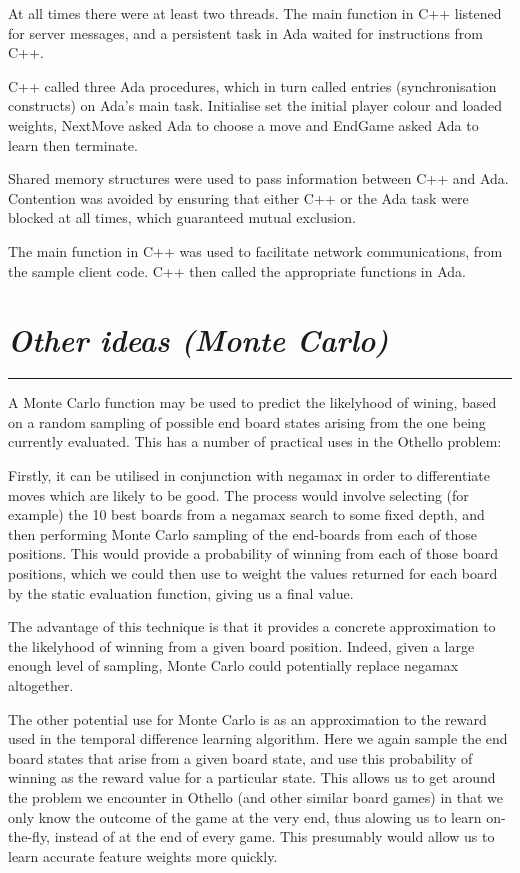 \documentclass[10pt]{report}
\begin{document}
\begin{multicols}{2}
At all times there were at least two threads. The main function in C++ listened for server messages, and a persistent task in Ada waited for instructions from C++.

C++ called three Ada procedures, which in turn called entries (synchronisation constructs) on Ada's main task. Initialise set the initial player colour and loaded weights, NextMove asked Ada to choose a move and EndGame asked Ada to learn then terminate.

Shared memory structures were used to pass information between C++ and Ada. Contention was avoided by ensuring that either C++ or the Ada task were blocked at all times, which guaranteed mutual exclusion.

The main function in C++ was used to facilitate network communications, from the sample client code. C++ then called the appropriate functions in Ada.

\section*{\emph{Other ideas (Monte Carlo)}}
\hrule
A Monte Carlo function may be used to predict the likelyhood of wining, based on a random sampling of possible end board states arising from the one being currently evaluated. This has a number of practical uses in the Othello problem:

Firstly, it can be utilised in conjunction with negamax in order to differentiate moves which are likely to be good. The process would involve selecting (for example) the 10 best boards from a negamax search to some fixed depth, and then performing Monte Carlo sampling of the end-boards from each of those positions. This would provide a probability of winning from each of those board positions, which we could then use to weight the values returned for each board by the static evaluation function, giving us a final value.

The advantage of this technique is that it provides a concrete approximation to the likelyhood of winning from a given board position. Indeed, given a large enough level of sampling, Monte Carlo could potentially replace negamax altogether.

The other potential use for Monte Carlo is as an approximation to the reward used in the temporal difference learning algorithm. Here we again sample the end board states that arise from a given board state, and use this probability of winning as the reward value for a particular state. This allows us to get around the problem we encounter in Othello (and other similar board games) in that we only know the outcome of the game at the very end, thus alowing us to learn on-the-fly, instead of at the end of every game. This presumably would allow us to learn accurate feature weights more quickly.


\end{multicols}
\end{document}

